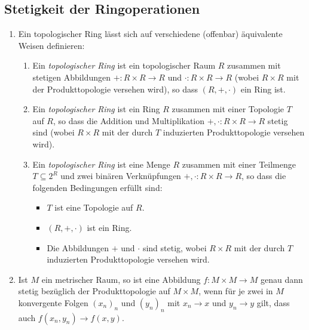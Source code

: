 \documentclass[a4paper, 10pt, numbers=noenddot]{scrartcl}
\begin{document}
\subsection*{Stetigkeit der Ringoperationen}

\begin{recall}
  \begin{enumerate}
    \item
      Ein topologischer Ring lässt sich auf verschiedene (offenbar) äquivalente Weisen definieren:
      \begin{enumerate}
        \item
          Ein \emph{topologischer Ring} ist ein topologischer Raum $R$ zusammen mit stetigen Abbildungen $+ \colon R \times R \to R$ und $\cdot \colon R \times R \to R$ (wobei $R \times R$ mit der Produkttopologie versehen wird), so dass $(R, +, \cdot)$ ein Ring ist.
        \item
          Ein \emph{topologischer Ring} ist ein Ring $R$ zusammen mit einer Topologie $T$ auf $R$, so dass die Addition und Multiplikation $+, \cdot \colon R \times R \to R$ stetig sind (wobei $R \times R$ mit der durch $T$ induzierten Produkttopologie versehen wird).
        \item
          Ein \emph{topologischer Ring} ist eine Menge $R$ zusammen mit einer Teilmenge $T \subseteq 2^R$ und zwei binären Verknüpfungen $+, \cdot \colon R \times R \to R$, so dass die folgenden Bedingungen erfüllt sind:
          \begin{itemize}
            \item
              $T$ ist eine Topologie auf $R$.
            \item
              $(R, +, \cdot)$ ist ein Ring.
            \item
              Die Abbildungen $+$ und $\cdot$ sind stetig, wobei $R \times R$ mit der durch $T$ induzierten Produkttopologie versehen wird.
          \end{itemize}
      \end{enumerate}
    \item
      Ist $M$ ein metrischer Raum, so ist eine Abbildung $f \colon M \times M \to M$ genau dann stetig bezüglich der Produkttopologie auf $M \times M$, wenn für je zwei in $M$ konvergente Folgen $(x_n)_n$ und $(y_n)_n$ mit $x_n \to x$ und $y_n \to y$ gilt, dass auch $f(x_n, y_n) \to f(x,y)$.
  \end{enumerate}
\end{recall}
\end{document}
